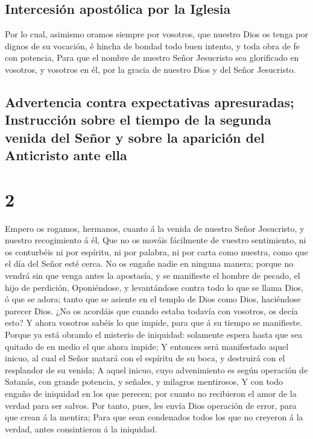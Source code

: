 \hypertarget{intercesiuxf3n-apostuxf3lica-por-la-iglesia}{%
\subsection{Intercesión apostólica por la
Iglesia}\label{intercesiuxf3n-apostuxf3lica-por-la-iglesia}}

 Por lo cual, asimismo oramos siempre por vosotros, que
nuestro Dios os tenga por dignos de su vocación, é hincha de bondad todo
buen intento, y toda obra de fe con potencia,  Para que
el nombre de nuestro Señor Jesucristo sea glorificado en vosotros, y
vosotros en él, por la gracia de nuestro Dios y del Señor Jesucristo.

\hypertarget{advertencia-contra-expectativas-apresuradas-instrucciuxf3n-sobre-el-tiempo-de-la-segunda-venida-del-seuxf1or-y-sobre-la-apariciuxf3n-del-anticristo-ante-ella}{%
\subsection{Advertencia contra expectativas apresuradas; Instrucción
sobre el tiempo de la segunda venida del Señor y sobre la aparición del
Anticristo ante
ella}\label{advertencia-contra-expectativas-apresuradas-instrucciuxf3n-sobre-el-tiempo-de-la-segunda-venida-del-seuxf1or-y-sobre-la-apariciuxf3n-del-anticristo-ante-ella}}

\hypertarget{section-1}{%
\section{2}\label{section-1}}

 Empero os rogamos, hermanos, cuanto á la venida de
nuestro Señor Jesucristo, y nuestro recogimiento á él, 
Que no os mováis fácilmente de vuestro sentimiento, ni os conturbéis ni
por espíritu, ni por palabra, ni por carta como nuestra, como que el día
del Señor esté cerca.  No os engañe nadie en ninguna
manera; porque no vendrá sin que venga antes la apostasía, y se
manifieste el hombre de pecado, el hijo de perdición, 
Oponiéndose, y levantándose contra todo lo que se llama Dios, ó que se
adora; tanto que se asiente en el templo de Dios como Dios, haciéndose
parecer Dios.  ¿No os acordáis que cuando estaba todavía
con vosotros, os decía esto?  Y ahora vosotros sabéis lo
que impide, para que á su tiempo se manifieste.  Porque ya
está obrando el misterio de iniquidad: solamente espera hasta que sea
quitado de en medio el que ahora impide;  Y entonces será
manifestado aquel inicuo, al cual el Señor matará con el espíritu de su
boca, y destruirá con el resplandor de su venida;  A aquel
inicuo, cuyo advenimiento es según operación de Satanás, con grande
potencia, y señales, y milagros mentirosos,  Y con todo
engaño de iniquidad en los que perecen; por cuanto no recibieron el amor
de la verdad para ser salvos.  Por tanto, pues, les envía
Dios operación de error, para que crean á la mentira; 
Para que sean condenados todos los que no creyeron á la verdad, antes
consintieron á la iniquidad.

